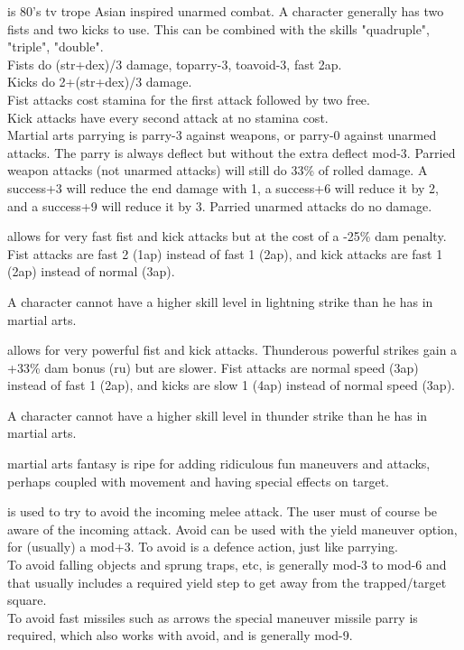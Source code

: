  is 80's tv trope Asian inspired unarmed combat. A character generally has two fists and two kicks to use. This can be combined with the skills "quadruple", "triple", "double". \\
Fists do (str+dex)/3 damage, toparry-3, toavoid-3, fast 2ap. \\
Kicks do 2+(str+dex)/3 damage.\\
Fist attacks cost stamina for the first attack followed by two free.\\
Kick attacks have every second attack at no stamina cost. \\
Martial arts parrying is parry-3 against weapons, or parry-0 against unarmed attacks. The parry is always deflect but without the extra deflect mod-3. Parried weapon attacks (not unarmed attacks) will still do 33\% of rolled damage. A success+3 will reduce the end damage with 1, a success+6 will reduce it by 2, and a success+9 will reduce it by 3. Parried unarmed attacks do no damage.

 allows for very fast fist and kick attacks but at the cost of a -25\% dam penalty. Fist attacks are fast 2 (1ap) instead of fast 1 (2ap), and kick attacks are fast 1 (2ap) instead of normal (3ap).

A character cannot have a higher skill level in lightning strike than he has in martial arts.

 allows for very powerful fist and kick attacks.  Thunderous powerful strikes gain a +33\% dam bonus (ru) but are slower. Fist attacks are normal speed (3ap) instead of fast 1 (2ap), and kicks are slow 1 (4ap) instead of normal speed (3ap).

A character cannot have a higher skill level in thunder strike than he has in martial arts.


\closeskillslist
\todo martial arts fantasy is ripe for adding ridiculous fun maneuvers and attacks, perhaps coupled with movement and having special effects on target.
\openskillslist


 is used to try to avoid the incoming melee attack. The user must of course be aware of the incoming attack. Avoid can be used with the yield maneuver option, for (usually) a mod+3. To avoid is a defence action, just like parrying. \\
To avoid falling objects and sprung traps, etc, is generally mod-3 to mod-6 and that usually includes a required yield step to get away from the trapped/target square. \\
To avoid fast missiles such as arrows the special maneuver missile parry is required, which also works with avoid, and is generally mod-9.

